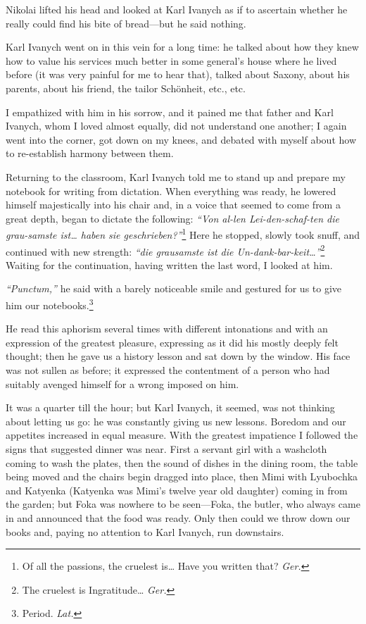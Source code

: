 Nikolai lifted his head and looked at Karl Ivanych as if to ascertain whether he really could find his bite of bread---but he said nothing.

Karl Ivanych went on in this vein for a long time: he talked about how they knew how to value his services much better in some general's house where he lived before (it was very painful for me to hear that), talked about Saxony, about his parents, about his friend, the tailor Sch\"onheit, etc., etc.

I empathized with him in his sorrow, and it pained me that father and Karl Ivanych, whom I loved almost equally, did not understand one another; I again went into the corner, got down on my knees, and debated with myself about how to re-establish harmony between them.

Returning to the classroom, Karl Ivanych told me to stand up and prepare my notebook for writing from dictation. When everything was ready, he lowered himself majestically into his chair and, in a voice that seemed to come from a great depth, began to dictate the following: \textit{``Von al-len Lei-den-schaf-ten die grau-samste ist\ldots{} haben sie geschrieben?''}\footnote{Of all the passions, the cruelest is\ldots{} Have you written that? \textit{Ger.}} Here he stopped, slowly took snuff, and continued with new strength: \textit{``die grausamste ist die Un-dank-bar-keit\ldots{}''}\footnote{The cruelest is Ingratitude\ldots{} \textit{Ger.}} Waiting for the continuation, having written the last word, I looked at him. %

\textit{``Punctum,''} he said with a barely noticeable smile and gestured for us to give him our notebooks.\footnote{Period. \textit{Lat.}} %

He read this aphorism several times with different intonations and with an expression of the greatest pleasure, expressing as it did his mostly deeply felt thought; then he gave us a history lesson and sat down by the window. His face was not sullen as before; it expressed the contentment of a person who had suitably avenged himself for a wrong imposed on him.

It was a quarter till the hour; but Karl Ivanych, it seemed, was not thinking about letting us go: he was constantly giving us new lessons. Boredom and our appetites increased in equal measure. With the greatest impatience I followed the signs that suggested dinner was near. First a servant girl with a washcloth coming to wash the plates, then the sound of dishes in the dining room, the table being moved and the chairs begin dragged into place, then Mimi with Lyubochka and Katyenka (Katyenka was Mimi's twelve year old daughter) coming in from the garden; but Foka was nowhere to be seen---Foka, the butler, who always came in and announced that the food was ready. Only then could we throw down our books and, paying no attention to Karl Ivanych, run downstairs.

